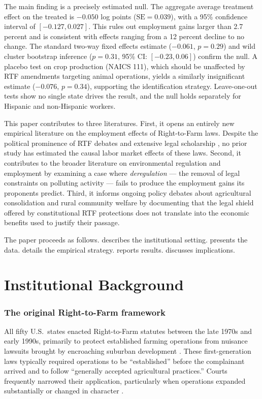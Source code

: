 \documentclass[12pt]{article}
\begin{document}
The main finding is a precisely estimated null. The aggregate average treatment effect on the treated is $-0.050$ log points ($\text{SE} = 0.039$), with a 95\% confidence interval of $[-0.127, 0.027]$. This rules out employment gains larger than 2.7 percent and is consistent with effects ranging from a 12 percent decline to no change. The standard two-way fixed effects estimate ($-0.061$, $p = 0.29$) and wild cluster bootstrap inference ($p = 0.31$, 95\% CI: $[-0.23, 0.06]$) confirm the null. A placebo test on crop production (NAICS 111), which should be unaffected by RTF amendments targeting animal operations, yields a similarly insignificant estimate ($-0.076$, $p = 0.34$), supporting the identification strategy. Leave-one-out tests show no single state drives the result, and the null holds separately for Hispanic and non-Hispanic workers.

This paper contributes to three literatures. First, it opens an entirely new empirical literature on the employment effects of Right-to-Farm laws. Despite the political prominence of RTF debates and extensive legal scholarship \citep{hamilton1998, centner2002, centner2006}, no prior study has estimated the causal labor market effects of these laws. Second, it contributes to the broader literature on environmental regulation and employment \citep{greenstone2002, walker2013} by examining a case where \textit{deregulation} --- the removal of legal constraints on polluting activity --- fails to produce the employment gains its proponents predict. Third, it informs ongoing policy debates about agricultural consolidation and rural community welfare \citep{lyson2005} by documenting that the legal shield offered by constitutional RTF protections does not translate into the economic benefits used to justify their passage.

The paper proceeds as follows.  describes the institutional setting.  presents the data.  details the empirical strategy.  reports results.  discusses implications.


\section{Institutional Background}
\label{sec:background}

\subsubsection*{The original Right-to-Farm framework} All fifty U.S.\ states enacted Right-to-Farm statutes between the late 1970s and early 1990s, primarily to protect established farming operations from nuisance lawsuits brought by encroaching suburban development \citep{hamilton1998}. These first-generation laws typically required operations to be ``established'' before the complainant arrived and to follow ``generally accepted agricultural practices.'' Courts frequently narrowed their application, particularly when operations expanded substantially or changed in character \citep{centner2002}.
\end{document}
